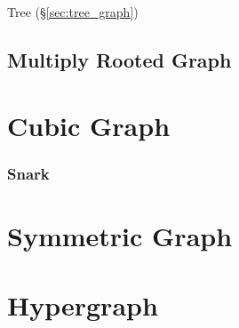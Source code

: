 Tree (\S\ref{sec:tree_graph})



\subsection{Multiply Rooted Graph}\label{sec:multiply_rooted}



\section{Cubic Graph}\label{sec:cubic_graph}

\subsubsection{Snark}\label{sec:snark}



\section{Symmetric Graph}\label{sec:symmetric_graph}

\section{Hypergraph}\label{sec:hypergraph}
